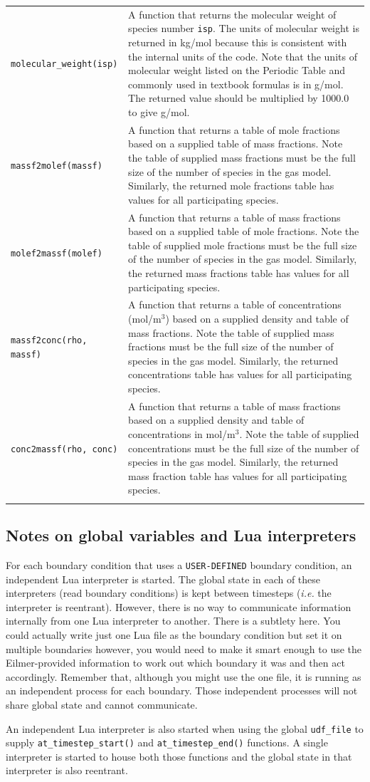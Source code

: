 \begin{tabular}{p{5cm}p{9cm}} 
 \noalign{\smallskip} \hline \noalign{\smallskip}
\texttt{molecular\_weight(isp)} & A function that returns
the molecular weight of species number \texttt{isp}. The
units of molecular weight is returned in kg/mol because this
is consistent with the internal units of the code. Note that
the units of molecular weight listed on the Periodic Table
and commonly used in textbook formulas is in g/mol. The returned
value should be multiplied by 1000.0 to give g/mol. \\
\texttt{massf2molef(massf)} & A function that returns a table
of mole fractions based on a supplied table of mass fractions.
Note the table of supplied mass fractions must be the full size
of the number of species in the gas model. Similarly, the returned
mole fractions table has values for all participating species. \\
\texttt{molef2massf(molef)} & A function that returns a table
of mass fractions based on a supplied table of mole fractions.
Note the table of supplied mole fractions must be the full size
of the number of species in the gas model. Similarly, the returned
mass fractions table has values for all participating species. \\
\texttt{massf2conc(rho, massf)} & A function that returns a table
of concentrations (mol/m$^3$) based on a supplied density and
table of mass fractions.
Note the table of supplied mass fractions must be the full size
of the number of species in the gas model. Similarly, the returned
concentrations table has values for all participating species. \\
\texttt{conc2massf(rho, conc)} & A function that returns a table
of mass fractions based on a supplied density and table of concentrations
in mol/m$^3$.
Note the table of supplied concentrations must be the full size
of the number of species in the gas model. Similarly, the returned
mass fraction table has values for all participating species. \\
\noalign{\smallskip} \hline \noalign{\smallskip}
\end{tabular}

\subsection{Notes on global variables and Lua interpreters}
%
For each boundary condition that uses a \verb!USER-DEFINED! boundary condition, 
an independent Lua interpreter is started. 
The global state in each of these interpreters (read boundary conditions) 
is kept between timesteps (\textit{i.e.} the interpreter is reentrant). 
However, there is no way to communicate information internally from one Lua interpreter to another. 
There is a subtlety here. 
You could actually write just one Lua file as the boundary condition but set it on multiple boundaries 
however, you would need to make it smart enough to use the Eilmer-provided information to work out 
which boundary it was and then act accordingly. 
Remember that, although you might use the one file, 
it is running as an independent process for each boundary. 
Those independent processes will not share global state and cannot communicate.

\medskip
An independent Lua interpreter is also started when using the global \verb!udf_file! 
to supply \verb!at_timestep_start()! and \verb!at_timestep_end()! functions. 
A single interpreter is started to house both those functions and 
the global state in that interpreter is also reentrant. 


